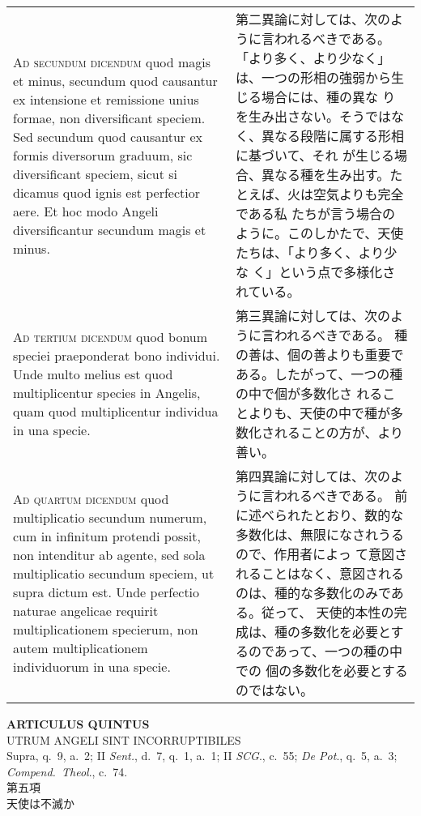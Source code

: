 \documentclass[10pt]{jsarticle} %
\begin{document}
\begin{longtable}{p{21em}p{21em}}
\\


{\scshape Ad secundum dicendum} quod magis et minus,
secundum quod causantur ex intensione et remissione unius formae, non
diversificant speciem. Sed secundum quod causantur ex formis diversorum
graduum, sic diversificant speciem, sicut si dicamus quod ignis est
perfectior aere. Et hoc modo Angeli diversificantur secundum magis et
minus.


&


第二異論に対しては、次のように言われるべきである。
「より多く、より少なく」は、一つの形相の強弱から生じる場合には、種の異な
 りを生み出さない。そうではなく、異なる段階に属する形相に基づいて、それ
 が生じる場合、異なる種を生み出す。たとえば、火は空気よりも完全である私
 たちが言う場合のように。このしかたで、天使たちは、「より多く、より少な
 く」という点で多様化されている。

\\


{\scshape Ad tertium dicendum} quod bonum speciei
praeponderat bono individui. Unde multo melius est quod multiplicentur
species in Angelis, quam quod multiplicentur individua in una specie.

&

第三異論に対しては、次のように言われるべきである。
種の善は、個の善よりも重要である。したがって、一つの種の中で個が多数化さ
 れることよりも、天使の中で種が多数化されることの方が、より善い。


\\


{\scshape Ad quartum dicendum} quod multiplicatio
secundum numerum, cum in infinitum protendi possit, non intenditur ab
agente, sed sola multiplicatio secundum speciem, ut supra dictum
est. Unde perfectio naturae angelicae requirit multiplicationem
specierum, non autem multiplicationem individuorum in una specie.


&

第四異論に対しては、次のように言われるべきである。
前に述べられたとおり、数的な多数化は、無限になされうるので、作用者によっ
 て意図されることはなく、意図されるのは、種的な多数化のみである。従って、
 天使的本性の完成は、種の多数化を必要とするのであって、一つの種の中での
 個の多数化を必要とするのではない。




\end{longtable}

\newpage

\begin{center}
 {\Large {\bf ARTICULUS QUINTUS}}\\
 {\large UTRUM ANGELI SINT INCORRUPTIBILES}\\
 {\footnotesize Supra, q.~9, a.~2; II {\itshape Sent.}, d.~7, q.~1,
 a.~1; II {\itshape SCG}., c.~55; {\itshape De Pot}., q.~5, a.~3;
 {\itshape Compend.~Theol}., c.~74.}\\
 {\Large 第五項\\天使は不滅か}
\end{center}
\end{document}
